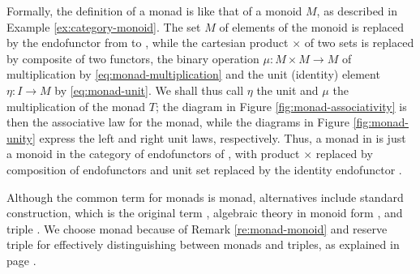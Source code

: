 \begin{remark}
  \label{re:monad-monoid}

  Formally, the definition of a monad is like that of a monoid $M$, as
  described in Example \ref{ex:category-monoid}. The set $M$ of
  elements of the monoid is replaced by the endofunctor  from
   to , while the cartesian product $\times$ of two sets
  is replaced by composite of two functors, the binary operation $\mu:
  M \times M \to M$ of multiplication by
  \eqref{eq:monad-multiplication} and the unit (identity) element
  $\eta: I \to M$ by \eqref{eq:monad-unit}. We shall thus call $\eta$
  the unit and $\mu$ the multiplication of the monad $T$; the diagram
  in Figure \ref{fig:monad-associativity} is then the associative law
  for the monad, while the diagrams in Figure \ref{fig:monad-unity}
  express the left and right unit laws, respectively. Thus, a monad in
   is just a monoid in the category of endofunctors of ,
  with product $\times$ replaced by composition of endofunctors and
  unit set replaced by the identity endofunctor
  \parencite[138]{maclane-1998}.

\end{remark}


\begin{terminology}
  \label{ter:monad}

  Although the common term for monads is monad, alternatives
  include standard construction, which is the original term
  \parencite[30]{manes-1976}, algebraic theory in monoid form
  \parencite[29]{manes-1976}, and triple
  \parencites[83]{barr-2005}[372]{barr-wells-2012}.
  We choose monad because of Remark
  \ref{re:monad-monoid} and reserve triple for effectively
  distinguishing between monads and triples, as explained in page
  \pageref{ter:triple}.

\end{terminology}

